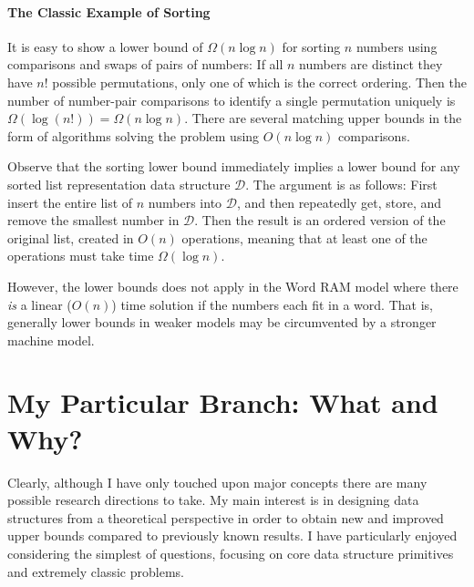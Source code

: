 \paragraph{The Classic Example of Sorting}
It is easy to show a lower bound of $\Omega(n \log n)$ for sorting $n$ numbers using comparisons and swaps of pairs of numbers: If all $n$ numbers are distinct they have $n!$ possible permutations, only one of which is the correct ordering. Then the number of number-pair comparisons to identify a single permutation uniquely is $\Omega(\log (n!)) = \Omega(n \log n)$. There are several matching upper bounds in the form of algorithms solving the problem using $O(n \log n)$ comparisons.

Observe that the sorting lower bound immediately implies a lower bound for any sorted list representation data structure $\mathcal{D}$. The argument is as follows: First insert the entire list of $n$ numbers into $\mathcal{D}$, and then repeatedly get, store, and remove the smallest number in $\mathcal{D}$. Then the result is an ordered version of the original list, created in $O(n)$ operations, meaning that at least one of the operations must take time $\Omega(\log n)$.

However, the lower bounds does not apply in the Word RAM model where there \emph{is} a linear ($O(n)$) time solution if the numbers each fit in a word. That is, generally lower bounds in weaker models may be circumvented by a stronger machine model.

\section{My Particular Branch: What and Why?}
Clearly, although I have only touched upon major concepts there are many possible research directions to take. My main interest is in designing data structures from a theoretical perspective in order to obtain new and improved upper bounds compared to previously known results. I have particularly enjoyed considering the simplest of questions, focusing on core data structure primitives and extremely classic problems.

